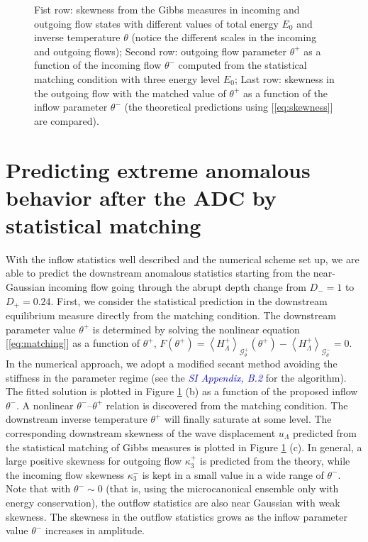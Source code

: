 \documentclass[9pt,twocolumn,twoside,lineno]{pnas-new}
\begin{document}
\begin{figure}[h]



\caption{Fist row: skewness from the Gibbs measures in incoming and outgoing
flow states with different values of total energy $E_{0}$ and inverse
temperature $\theta$ (notice the different scales in the incoming
and outgoing flows); Second row: outgoing flow parameter $\theta^{+}$
as a function of the incoming flow $\theta^{-}$ computed from the
statistical matching condition with three energy level $E_{0}$; Last
row: skewness in the outgoing flow with the matched value of $\theta^{+}$
as a function of the inflow parameter $\theta^{-}$ (the theoretical
predictions using [\ref{eq:skewness}] are compared).\label{fig:matching}}
\end{figure}

\section{Predicting extreme anomalous behavior after the ADC by statistical matching}

With the inflow statistics well described and the numerical scheme
set up, we are able to predict the downstream anomalous statistics
starting from the near-Gaussian incoming flow going through the abrupt
depth change from $D_{-}=1$ to $D_{+}=0.24$. First, we consider
the statistical prediction in the downstream equilibrium measure directly
from the matching condition. The downstream parameter value $\theta^{+}$
is determined by solving the nonlinear equation [\ref{eq:matching}]
as a function of $\theta^{+}$, $F\left(\theta^{+}\right)=\left\langle H_{\Lambda}^{+}\right\rangle _{\mathcal{G}_{\theta}^{+}}\left(\theta^{+}\right)-\left\langle H_{\Lambda}^{+}\right\rangle _{\mathcal{G}_{\theta}^{-}}=0$.
In the numerical approach, we adopt a modified secant method avoiding
the stiffness in the parameter regime (see the \textcolor{blue}{\emph{SI Appendix, B.2}}
for the algorithm). The fitted solution is plotted in Figure
\ref{fig:matching} (b) as a function of the proposed inflow $\theta^{-}$.
A nonlinear $\theta^{-}$--$\theta^{+}$ relation is discovered from
the matching condition. The downstream inverse temperature $\theta^{+}$
will finally saturate at some level. The corresponding downstream
skewness of the wave displacement $u_{\Lambda}$ predicted from the
statistical matching of Gibbs measures is plotted in Figure \ref{fig:matching} (c). In general, a large positive skewness
for outgoing flow $\kappa_3^{+}$ is predicted from the theory, while
the incoming flow skewness $\kappa_3^{-}$ is kept in a small value
in a wide range of $\theta^{-}$. Note that with $\theta^{-}\sim0$
(that is, using the microcanonical ensemble only with energy conservation),
the outflow statistics are also near Gaussian with weak skewness.
The skewness in the outflow statistics grows as the inflow parameter
value $\theta^{-}$ increases in amplitude. 
\end{document}
